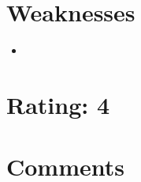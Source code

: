 \documentclass [12pt]{article}
\begin{document}
    \section{Weaknesses} %
    \label{sec:weaknesses}
        \begin{itemize}
            \item 
        \end{itemize}

    \section{Rating: 4} %
    \label{sec:rating}

    \section{Comments} %
    \label{sec:comments}
 
        
\end{document}
